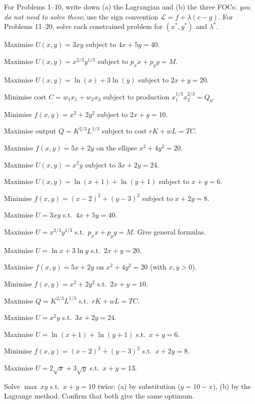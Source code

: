 For Problems 1--10, write down (a) the Lagrangian and (b) the three FOCs:
\emph{you do not need to solve these}; use the sign convention
$\mathcal{L} = f + \lambda(c - g)$. For Problems 11--20, solve each
constrained problem for $(x^*, y^*)$ and $\lambda^*$.

\begin{problems}
  \item Maximise $U(x, y) = 3 x y$ subject to $4 x + 5 y = 40$.
  \item Maximise $U(x, y) = x^{2/3} y^{1/3}$ subject to $p_x x + p_y y = M$.
  \item Maximise $U(x, y) = \ln(x) + 3 \ln(y)$ subject to $2 x + y = 20$.
  \item Minimise cost $C = w_1 x_1 + w_2 x_2$ subject to production $x_1^{1/3} x_2^{2/3} = Q_0$.
  \item Minimise $f(x, y) = x^2 + 2 y^2$ subject to $2 x + y = 10$.
  \item Maximise output $Q = K^{2/3} L^{1/3}$ subject to cost $r K + w L = TC$.
  \item Maximise $f(x, y) = 5 x + 2 y$ on the ellipse $x^2 + 4 y^2 = 20$.
  \item Maximise $U(x, y) = x^2 y$ subject to $3 x + 2 y = 24$.
  \item Maximise $U(x, y) = \ln(x + 1) + \ln(y + 1)$ subject to $x + y = 6$.
  \item Minimise $f(x, y) = (x - 2)^2 + (y - 3)^2$ subject to $x + 2 y = 8$.
  \item Maximise $U = 3 x y$ s.t.\ $4 x + 5 y = 40$.
  \item Maximise $U = x^{2/3} y^{1/3}$ s.t.\ $p_x x + p_y y = M$. Give general formulas.
  \item Maximise $U = \ln x + 3 \ln y$ s.t.\ $2 x + y = 20$.
  \item Maximise $f(x, y) = 5 x + 2 y$ on $x^2 + 4 y^2 = 20$ (with $x, y > 0$).
  \item Minimise $f(x, y) = x^2 + 2 y^2$ s.t.\ $2 x + y = 10$.
  \item Maximise $Q = K^{2/3} L^{1/3}$ s.t.\ $r K + w L = TC$.
  \item Maximise $U = x^2 y$ s.t.\ $3 x + 2 y = 24$.
  \item Maximise $U = \ln(x + 1) + \ln(y + 1)$ s.t.\ $x + y = 6$.
  \item Minimise $f(x, y) = (x - 2)^2 + (y - 3)^2$ s.t.\ $x + 2 y = 8$.
  \item Maximise $U = 2 \sqrt{x} + 3 \sqrt{y}$ s.t.\ $x + y = 13$.
  \item Solve $\max\, x y$ s.t.\ $x + y = 10$ twice: (a) by substitution ($y = 10 - x$), (b) by the Lagrange method. Confirm that both give the same optimum.

\end{problems}
